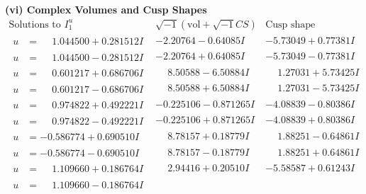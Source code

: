\documentclass[1p]{elsarticle_modified}
\theoremstyle{definition}
\newcommand{\I}{\sqrt{-1}}
\begin{document}
\newpage\flushleft \textbf{(vi) Complex Volumes and Cusp Shapes}
$$\begin{array}{c|c|c}  
\text{Solutions to }I^u_{1}& \I (\text{vol} + \sqrt{-1}CS) & \text{Cusp shape}\\
 \hline 
\begin{aligned}
u &= \phantom{-}1.044500 + 0.281512 I\end{aligned}
 & -2.20764 - 0.64085 I & -5.73049 + 0.77381 I \\ \hline\begin{aligned}
u &= \phantom{-}1.044500 - 0.281512 I\end{aligned}
 & -2.20764 + 0.64085 I & -5.73049 - 0.77381 I \\ \hline\begin{aligned}
u &= \phantom{-}0.601217 + 0.686706 I\end{aligned}
 & \phantom{-}8.50588 - 6.50884 I & \phantom{-}1.27031 + 5.73425 I \\ \hline\begin{aligned}
u &= \phantom{-}0.601217 - 0.686706 I\end{aligned}
 & \phantom{-}8.50588 + 6.50884 I & \phantom{-}1.27031 - 5.73425 I \\ \hline\begin{aligned}
u &= \phantom{-}0.974822 + 0.492221 I\end{aligned}
 & -0.225106 - 0.871265 I & -4.08839 - 0.80386 I \\ \hline\begin{aligned}
u &= \phantom{-}0.974822 - 0.492221 I\end{aligned}
 & -0.225106 + 0.871265 I & -4.08839 + 0.80386 I \\ \hline\begin{aligned}
u &= -0.586774 + 0.690510 I\end{aligned}
 & \phantom{-}8.78157 + 0.18779 I & \phantom{-}1.88251 - 0.64861 I \\ \hline\begin{aligned}
u &= -0.586774 - 0.690510 I\end{aligned}
 & \phantom{-}8.78157 - 0.18779 I & \phantom{-}1.88251 + 0.64861 I \\ \hline\begin{aligned}
u &= \phantom{-}1.109660 + 0.186764 I\end{aligned}
 & \phantom{-}2.94416 + 0.20510 I & -5.58587 + 0.61243 I \\ \hline\begin{aligned}
u &= \phantom{-}1.109660 - 0.186764 I\end{aligned}

\end{array}$$
\end{document}
